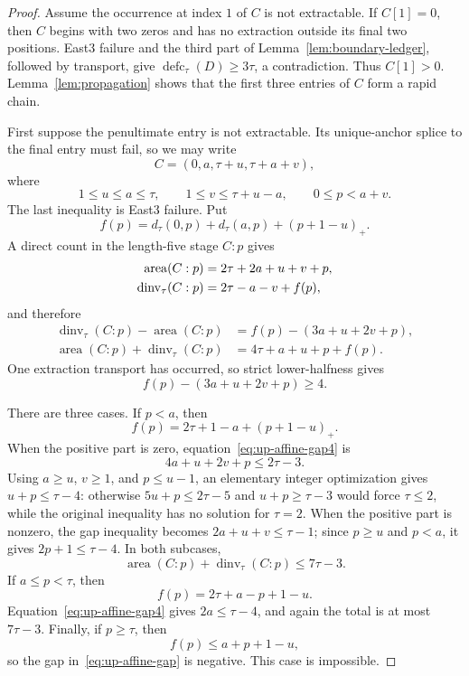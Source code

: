 \documentclass[11pt]{article}
\theoremstyle{definition}
\theoremstyle{remark}
\newcommand{\area}{\operatorname{area}}
\newcommand{\dinv}{\operatorname{dinv}}
\newcommand{\defc}{\operatorname{defc}}
\begin{document}
\begin{proof}
Assume the occurrence at index $1$ of $C$ is not extractable.  If $C[1]=0$,
then $C$ begins with two zeros and has no extraction outside its final two
positions.  East3 failure and the third part of
Lemma~\ref{lem:boundary-ledger}, followed by transport, give
$\defc_\tau(D)\ge3\tau$, a contradiction.  Thus $C[1]>0$.
Lemma~\ref{lem:propagation} shows that the first three entries of $C$ form a
rapid chain.

First suppose the penultimate entry is not extractable.  Its unique-anchor
splice to the final entry must fail, so we may write
\[
 C=(0,a,\tau+u,\tau+a+v),
\]
where
\begin{equation}
 1\le u\le a\le\tau,
 \qquad
 1\le v\le\tau+u-a,
 \qquad
 0\le p<a+v.
 \label{eq:up-affine-range}
\end{equation}
The last inequality is East3 failure.  Put
\[
 f(p)=d_\tau(0,p)+d_\tau(a,p)+(p+1-u)_+.
\]
A direct count in the length-five stage $C:p$ gives
\begin{align}
 \area(C:p)&=2\tau+2a+u+v+p,\notag\\
 \dinv_\tau(C:p)&=2\tau-a-v+f(p),
 \label{eq:up-affine-stats}
\end{align}
and therefore
\begin{align}
 \dinv_\tau(C:p)-\area(C:p)
 &=f(p)-(3a+u+2v+p),
 \label{eq:up-affine-gap}\\
 \area(C:p)+\dinv_\tau(C:p)
 &=4\tau+a+u+p+f(p).
 \label{eq:up-affine-total}
\end{align}
One extraction transport has occurred, so strict lower-halfness gives
\begin{equation}
 f(p)-(3a+u+2v+p)\ge4.
 \label{eq:up-affine-gap4}
\end{equation}

There are three cases.  If $p<a$, then
\[
 f(p)=2\tau+1-a+(p+1-u)_+.
\]
When the positive part is zero, equation~\eqref{eq:up-affine-gap4} is
\[
 4a+u+2v+p\le2\tau-3.
\]
Using $a\ge u$, $v\ge1$, and $p\le u-1$, an elementary integer
optimization gives $u+p\le\tau-4$: otherwise
$5u+p\le2\tau-5$ and $u+p\ge\tau-3$ would force $\tau\le2$, while the
original inequality has no solution for $\tau=2$.  When the positive part
is nonzero, the gap inequality becomes
$2a+u+v\le\tau-1$; since $p\ge u$ and $p<a$, it gives
$2p+1\le\tau-4$.  In both subcases,
\[
 \area(C:p)+\dinv_\tau(C:p)\le7\tau-3.
\]
If $a\le p<\tau$, then
\[
 f(p)=2\tau+a-p+1-u.
\]
Equation~\eqref{eq:up-affine-gap4} gives $2a\le\tau-4$, and again the total
is at most $7\tau-3$.  Finally, if $p\ge\tau$, then
\[
 f(p)\le a+p+1-u,
\]
so the gap in~\eqref{eq:up-affine-gap} is negative.  This case is
impossible.


\end{proof}
\end{document}
